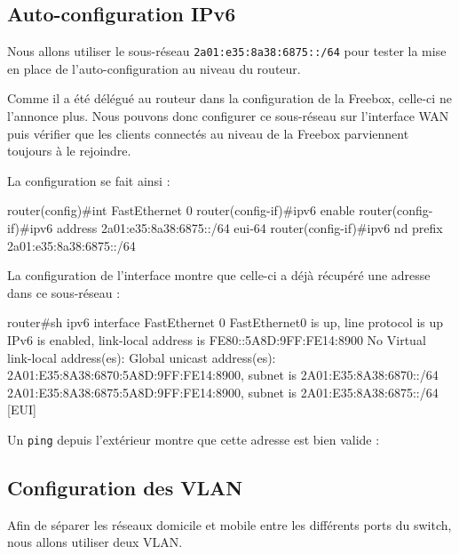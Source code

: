 \subsection{Auto-configuration IPv6}

Nous allons utiliser le sous-réseau \texttt{2a01:e35:8a38:6875::/64} pour tester la mise en place de l'auto-configuration au niveau du routeur.

Comme il a été délégué au routeur dans la configuration de la Freebox, celle-ci ne l'annonce plus.
Nous pouvons donc configurer ce sous-réseau sur l'interface WAN puis vérifier que les clients connectés au niveau de la Freebox parviennent toujours à le rejoindre.

La configuration se fait ainsi :

\begin{code}
router(config)#int FastEthernet 0
router(config-if)#ipv6 enable
router(config-if)#ipv6 address 2a01:e35:8a38:6875::/64 eui-64
router(config-if)#ipv6 nd prefix 2a01:e35:8a38:6875::/64
\end{code}

La configuration de l'interface montre que celle-ci a déjà récupéré une adresse dans ce sous-réseau :

\begin{code}
router#sh ipv6 interface FastEthernet 0
FastEthernet0 is up, line protocol is up
  IPv6 is enabled, link-local address is FE80::5A8D:9FF:FE14:8900 
  No Virtual link-local address(es):
  Global unicast address(es):
    2A01:E35:8A38:6870:5A8D:9FF:FE14:8900, subnet is 2A01:E35:8A38:6870::/64
    2A01:E35:8A38:6875:5A8D:9FF:FE14:8900, subnet is 2A01:E35:8A38:6875::/64 [EUI]
\end{code}

Un \texttt{ping} depuis l'extérieur montre que cette adresse est bien valide :


\subsection{Configuration des VLAN}

Afin de séparer les réseaux domicile et mobile entre les différents ports du switch, nous allons utiliser deux VLAN.

